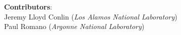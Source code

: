 \maketitle

\begin{center}\large
\textbf{Contributors}: \\
Jeremy Lloyd Conlin (\emph{Los Alamos National Laboratory}) \\
Paul Romano (\emph{Argonne National Laboratory})
\end{center}

\newpage
\tableofcontents
\clearpage
\listoftables
\listoftodos
